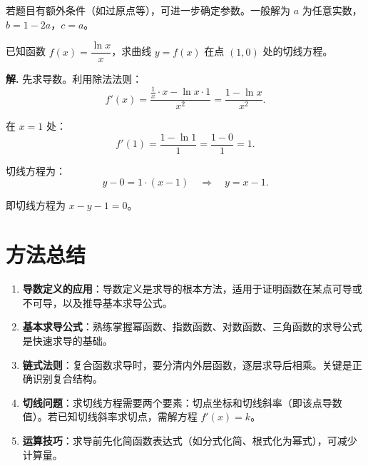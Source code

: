 \documentclass[11pt]{ctexrep}
\begin{document}
若题目有额外条件（如过原点等），可进一步确定参数。一般解为 $a$ 为任意实数，$b = 1 - 2a$，$c = a$。

\begin{realexam}[2025 上海一模]
    已知函数 $f(x) = \dfrac{\ln x}{x}$，求曲线 $y = f(x)$ 在点 $(1, 0)$ 处的切线方程。
\end{realexam}

\textbf{解.} 先求导数。利用除法法则：
\[
    f'(x) = \frac{\frac{1}{x} \cdot x - \ln x \cdot 1}{x^2} = \frac{1 - \ln x}{x^2}.
\]

在 $x = 1$ 处：
\[
    f'(1) = \frac{1 - \ln 1}{1} = \frac{1 - 0}{1} = 1.
\]

切线方程为：
\[
    y - 0 = 1 \cdot (x - 1) \quad \Rightarrow \quad y = x - 1.
\]

即切线方程为 $x - y - 1 = 0$。

\section*{方法总结}

\begin{enumerate}
    \item \textbf{导数定义的应用}：导数定义是求导的根本方法，适用于证明函数在某点可导或不可导，以及推导基本求导公式。
    \item \textbf{基本求导公式}：熟练掌握幂函数、指数函数、对数函数、三角函数的求导公式是快速求导的基础。
    \item \textbf{链式法则}：复合函数求导时，要分清内外层函数，逐层求导后相乘。关键是正确识别复合结构。
    \item \textbf{切线问题}：求切线方程需要两个要素：切点坐标和切线斜率（即该点导数值）。若已知切线斜率求切点，需解方程 $f'(x) = k$。
    \item \textbf{运算技巧}：求导前先化简函数表达式（如分式化简、根式化为幂式），可减少计算量。
\end{enumerate}
\end{document}
